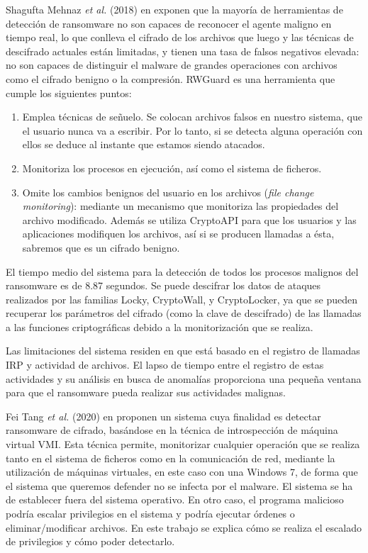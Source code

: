 Shagufta Mehnaz \textit{et al.} (2018) en \cite{Mehnaz2018} exponen que la mayoría de herramientas de detección de ransomware no son capaces de reconocer el agente maligno en tiempo real, lo que conlleva el cifrado de los archivos que luego y las técnicas de descifrado actuales están limitadas, y tienen una tasa de falsos negativos elevada: no son capaces de distinguir el malware de grandes operaciones con archivos como el cifrado benigno o la compresión. RWGuard es una herramienta que cumple los siguientes puntos:
\begin{enumerate}
\item Emplea técnicas de señuelo. Se colocan archivos falsos en nuestro sistema, que el usuario nunca va a escribir. Por lo tanto, si se detecta alguna operación con ellos se deduce al instante que estamos siendo atacados.
\item Monitoriza los procesos en ejecución, así como el sistema de ficheros.
\item Omite los cambios benignos del usuario en los archivos (\textit{file change monitoring}): mediante un mecanismo que monitoriza las propiedades del archivo modificado. Además se utiliza CryptoAPI para que los usuarios y las aplicaciones modifiquen los archivos, así si se producen llamadas a ésta, sabremos que es un cifrado benigno.
\end{enumerate}
El tiempo medio del sistema para la detección de todos los procesos malignos del ransomware es de 8.87 segundos. Se puede descifrar los datos de ataques realizados por las familias Locky, CryptoWall, y CryptoLocker, ya que se pueden recuperar los parámetros del cifrado (como la clave de descifrado) de las llamadas a las funciones criptográficas debido a la monitorización que se realiza. 

Las limitaciones del sistema residen en que está basado en el registro de llamadas \gls{IRP} y actividad de archivos. El lapso de tiempo entre el registro de estas actividades y su análisis en busca de anomalías proporciona una pequeña ventana para que el ransomware pueda realizar sus actividades malignas.

Fei Tang \textit{et al.} (2020) en \cite{TANG2020101997} proponen un sistema cuya finalidad es detectar ransomware de cifrado, basándose en la técnica de introspección de máquina virtual \gls{VMI}. Esta técnica permite, monitorizar cualquier operación que se realiza tanto en el sistema de ficheros como en la comunicación de red, mediante la utilización de máquinas virtuales, en este caso con una Windows 7, de forma que el sistema que queremos defender no se infecta por el malware. El sistema se ha de establecer fuera del sistema operativo. En otro caso, el programa malicioso podría escalar privilegios en el sistema y podría ejecutar órdenes o eliminar/modificar archivos. En este trabajo se explica cómo se realiza el escalado de privilegios y cómo poder detectarlo.

